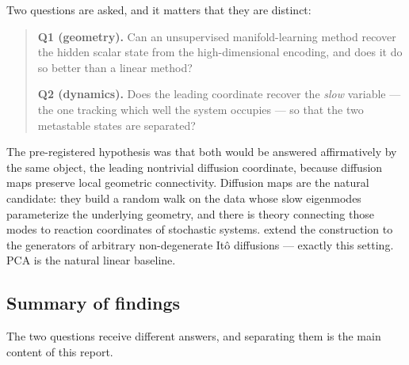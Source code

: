 \documentclass[11pt]{article}
\begin{document}
Two questions are asked, and it matters that they are distinct:

\begin{quote}
\textbf{Q1 (geometry).} Can an unsupervised manifold-learning method recover the
hidden scalar state from the high-dimensional encoding, and does it do so better
than a linear method?

\textbf{Q2 (dynamics).} Does the leading coordinate recover the \emph{slow}
variable --- the one tracking which well the system occupies --- so that the two
metastable states are separated?
\end{quote}

The pre-registered hypothesis was that both would be answered affirmatively by
the same object, the leading nontrivial diffusion coordinate, because diffusion
maps preserve local geometric connectivity. Diffusion maps
\citep{coifman2006diffusion} are the natural candidate: they build a random walk
on the data whose slow eigenmodes parameterize the underlying geometry, and there
is theory \citep{nadler2006diffusion,coifman2008diffusion} connecting those modes
to reaction coordinates of stochastic systems. \citet{banisch2017diffusion}
extend the construction to the generators of arbitrary non-degenerate It\^o
diffusions --- exactly this setting. PCA \citep{jolliffe2002principal} is the
natural linear baseline.

\subsection{Summary of findings}

The two questions receive different answers, and separating them is the main
content of this report.
\end{document}
